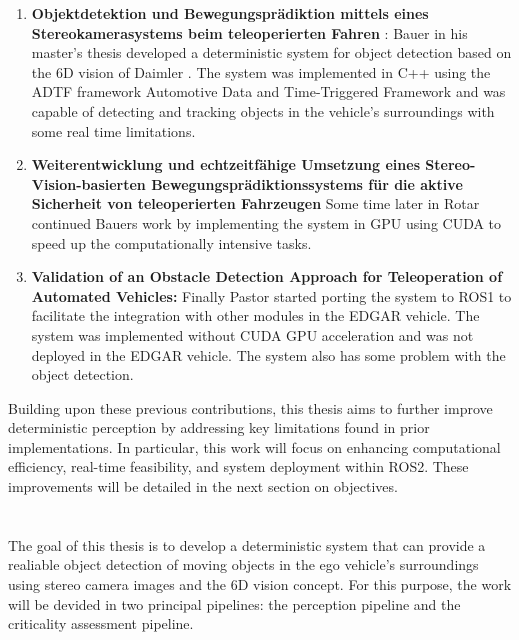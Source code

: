 \begin{enumerate}
  \item \textbf{Objektdetektion und Bewegungsprädiktion mittels eines Stereokamerasystems beim teleoperierten Fahren} \cite{previous_tfm_bauer}: Bauer 
  in his master's thesis developed a deterministic system for object detection based on the 6D vision of Daimler \cite{6d_vision_daimler}. The system 
  was implemented in C++ using the ADTF framework {Automotive Data and Time-Triggered Framework} and was capable of detecting and tracking objects in the vehicle's surroundings 
  with some real time limitations.

  \item \textbf{Weiterentwicklung und echtzeitfähige Umsetzung eines Stereo-Vision-basierten Bewegungsprädiktionssystems für die aktive Sicherheit von teleoperierten Fahrzeugen}
  Some time later in \cite{previous_tfm_gpu_implementation} Rotar continued Bauers work by implementing the system in GPU using CUDA to speed up the computationally intensive tasks.

  \item \textbf{Validation of an Obstacle Detection Approach for Teleoperation of Automated Vehicles:} Finally Pastor \cite{previous_tfm_pastor} started porting the system to ROS1
   to facilitate the integration with other modules in the EDGAR vehicle. The system was implemented without CUDA GPU acceleration
   and was not deployed in the EDGAR vehicle. The system also has some problem with the object detection.
\end{enumerate}

Building upon these previous contributions, this thesis aims to further improve deterministic perception by 
addressing key limitations found in prior implementations. 
In particular, this work will focus on enhancing computational efficiency, real-time feasibility, 
and system deployment within ROS2. These improvements will be detailed in the next section on objectives.






\section{}%


The goal of this thesis is to develop a deterministic system that can provide a realiable object detection
of moving objects in the ego vehicle's surroundings using stereo camera images and the 6D vision concept.
For this purpose, the work will be devided in two principal pipelines: the perception pipeline 
and the criticality assessment pipeline.


